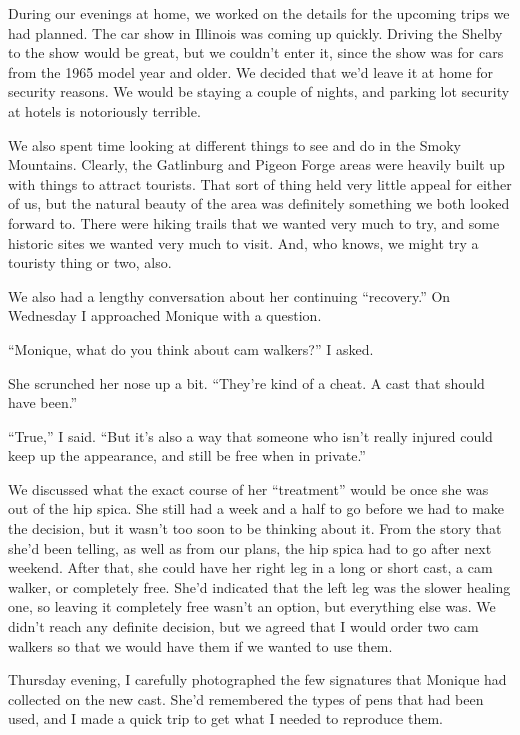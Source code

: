 During our evenings at home, we worked on the details for the upcoming trips we had
planned. The car show in Illinois was coming up quickly. Driving the Shelby to the show would be
great, but we couldn't enter it, since the show was for cars from the 1965 model year and older.
We decided that we'd leave it at home for security reasons. We would be staying a couple of
nights, and parking lot security at hotels is notoriously terrible.

We also spent time looking at different things to see and do in the Smoky Mountains.
Clearly, the Gatlinburg and Pigeon Forge areas were heavily built up with things to attract
tourists. That sort of thing held very little appeal for either of us, but the natural beauty of
the area was definitely something we both looked forward to. There were hiking trails that we
wanted very much to try, and some historic sites we wanted very much to visit. And, who knows,
we might try a touristy thing or two, also.

We also had a lengthy conversation about her continuing ``recovery.'' On Wednesday I
approached Monique with a question.

``Monique, what do you think about cam walkers?'' I asked.

She scrunched her nose up a bit. ``They're kind of a cheat. A cast that should have been.''

``True,'' I said. ``But it's also a way that someone who isn't really injured could keep up
the appearance, and still be free when in private.''

We discussed what the exact course of her ``treatment'' would be once she was out of the
hip spica. She still had a week and a half to go before we had to make the decision, but it
wasn't too soon to be thinking about it. From the story that she'd been telling, as well as from
our plans, the hip spica had to go after next weekend. After that, she could have her right leg
in a long or short cast, a cam walker, or completely free. She'd indicated that the left leg was
the slower healing one, so leaving it completely free wasn't an option, but everything else was.
We didn't reach any definite decision, but we agreed that I would order two cam walkers so that
we would have them if we wanted to use them.

Thursday evening, I carefully photographed the few signatures that Monique had collected on
the new cast. She'd remembered the types of pens that had been used, and I made a quick trip to
get what I needed to reproduce them.

